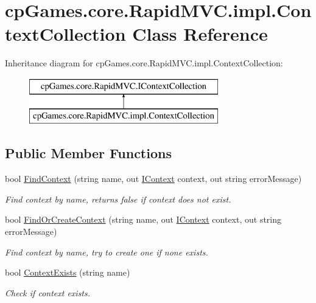 \hypertarget{classcp_games_1_1core_1_1_rapid_m_v_c_1_1impl_1_1_context_collection}{}\section{cp\+Games.\+core.\+Rapid\+M\+V\+C.\+impl.\+Context\+Collection Class Reference}
\label{classcp_games_1_1core_1_1_rapid_m_v_c_1_1impl_1_1_context_collection}
Inheritance diagram for cp\+Games.\+core.\+Rapid\+M\+V\+C.\+impl.\+Context\+Collection\+:\begin{figure}[H]
\begin{center}
\leavevmode
\includegraphics[height=2.000000cm]{classcp_games_1_1core_1_1_rapid_m_v_c_1_1impl_1_1_context_collection}
\end{center}
\end{figure}
\subsection*{Public Member Functions}
\begin{DoxyCompactItemize}
\item 
bool \mbox{\hyperlink{classcp_games_1_1core_1_1_rapid_m_v_c_1_1impl_1_1_context_collection_a718fdd345d5be5c3c5386bf2c3eee534}{Find\+Context}} (string name, out \mbox{\hyperlink{interfacecp_games_1_1core_1_1_rapid_m_v_c_1_1_i_context}{I\+Context}} context, out string error\+Message)
\begin{DoxyCompactList}\small\item\em Find context by name, returns false if context does not exist. \end{DoxyCompactList}\item 
bool \mbox{\hyperlink{classcp_games_1_1core_1_1_rapid_m_v_c_1_1impl_1_1_context_collection_abea4cb0d9ab2aad732b862b8f2a9dd2a}{Find\+Or\+Create\+Context}} (string name, out \mbox{\hyperlink{interfacecp_games_1_1core_1_1_rapid_m_v_c_1_1_i_context}{I\+Context}} context, out string error\+Message)
\begin{DoxyCompactList}\small\item\em Find context by name, try to create one if none exists. \end{DoxyCompactList}\item 
bool \mbox{\hyperlink{classcp_games_1_1core_1_1_rapid_m_v_c_1_1impl_1_1_context_collection_a288b7ee5d4388b498e8b213694761b4a}{Context\+Exists}} (string name)
\begin{DoxyCompactList}\small\item\em Check if context exists. \end{DoxyCompactList}\end{DoxyCompactItemize}
